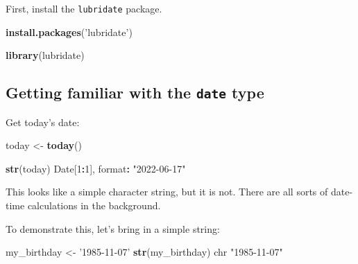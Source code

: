 \documentclass[]{book}
\newenvironment{Shaded}{\begin{snugshade}}{\end{snugshade}}
\newcommand{\DecValTok}[1]{\textcolor[rgb]{0.00,0.00,0.81}{#1}}
\newcommand{\KeywordTok}[1]{\textcolor[rgb]{0.13,0.29,0.53}{\textbf{#1}}}
\newcommand{\NormalTok}[1]{#1}
\newcommand{\OperatorTok}[1]{\textcolor[rgb]{0.81,0.36,0.00}{\textbf{#1}}}
\newcommand{\StringTok}[1]{\textcolor[rgb]{0.31,0.60,0.02}{#1}}
\begin{document}
First, install the \texttt{lubridate} package.

\begin{Shaded}
\begin{Highlighting}[]
\KeywordTok{install.packages}\NormalTok{(}\StringTok{'lubridate'}\NormalTok{)}
\end{Highlighting}
\end{Shaded}

\begin{Shaded}
\begin{Highlighting}[]
\KeywordTok{library}\NormalTok{(lubridate)}
\end{Highlighting}
\end{Shaded}

\hypertarget{getting-familiar-with-the-date-type}{%
\subsection*{\texorpdfstring{Getting familiar with the \texttt{date} type}{Getting familiar with the date type}}\label{getting-familiar-with-the-date-type}}

Get today's date:

\begin{Shaded}
\begin{Highlighting}[]
\NormalTok{today <-}\StringTok{ }\KeywordTok{today}\NormalTok{()}
\end{Highlighting}
\end{Shaded}

\begin{Shaded}
\begin{Highlighting}[]
\KeywordTok{str}\NormalTok{(today)}
\NormalTok{ Date[}\DecValTok{1}\OperatorTok{:}\DecValTok{1}\NormalTok{], format}\OperatorTok{:}\StringTok{ "2022-06-17"}
\end{Highlighting}
\end{Shaded}

This looks like a simple character string, but it is not. There are all sorts of date-time calculations in the background.

To demonstrate this, let's bring in a simple string:

\begin{Shaded}
\begin{Highlighting}[]
\NormalTok{my_birthday <-}\StringTok{ '1985-11-07'}
\KeywordTok{str}\NormalTok{(my_birthday)}
\NormalTok{ chr }\StringTok{"1985-11-07"}
\end{Highlighting}
\end{Shaded}
\end{document}
